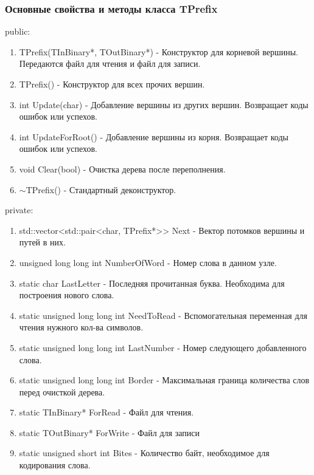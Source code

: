 \documentclass[12pt]{article}
\begin{document}
\subsubsection*{Основные свойства и методы класса TPrefix}

\noindent
public:

\begin{enumerate}
	\item TPrefix(TInBinary*, TOutBinary*) - Конструктор для корневой вершины. Передаются файл для чтения и файл для записи.
	\item TPrefix() - Конструктор для всех прочих вершин.
	\item int Update(char) - Добавление вершины из других вершин. Возвращает коды ошибок или успехов.
	\item int UpdateForRoot() - Добавление вершины из корня. Возвращает коды ошибок или успехов.
	\item void Clear(bool) - Очистка дерева после переполнения.
	\item $\sim$TPrefix() - Стандартный деконструктор.
\end{enumerate}
\noindent
private:

\begin{enumerate}
	\item std::vector<std::pair<char, TPrefix*>\hspace{0pt}> Next - Вектор потомков вершины и путей в них.
	\item unsigned long long int NumberOfWord - Номер слова в данном узле.
	\item static char LastLetter - Последняя прочитанная буква. Необходима для построения нового слова.
	\item static unsigned long long int NeedToRead - Вспомогательная переменная для чтения нужного кол-ва символов.
	\item static unsigned long long int LastNumber - Номер следующего добавленного слова.
	\item static unsigned long long int Border - Максимальная граница количества слов перед очисткой дерева.
	\item static TInBinary* ForRead - Файл для чтения.
	\item static TOutBinary* ForWrite - Файл для записи
	\item static unsigned short int Bites - Количество байт, необходимое для кодирования слова.
\end{enumerate}
\end{document}
